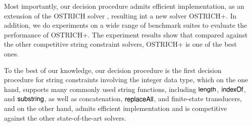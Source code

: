 Most importantly, our decision procedure admits efficient implementation, as an extension of the OSTRICH solver \cite{CHL+19}, resulting int a new solver OSTRICH+.  In addition, we do experiments on a wide range of benchmark suites to evaluate the performance of OSTRICH+. The experiment results show that compared against the other competitive string constraint solvers, OSTRICH+ is one of the best ones. 

To the best of our knowledge, our decision procedure is the first decision procedure for string constraints involving the integer data type, which on the one hand, supports many commonly used string functions, including $\mathsf{length}$, $\mathsf{indexOf}$, and $\mathsf{substring}$,  as well as concatenation, $\mathsf{replaceAll}$, and finite-state transducers, and on the other hand, admits efficient implementation and is competitive against the other state-of-the-art solvers.



